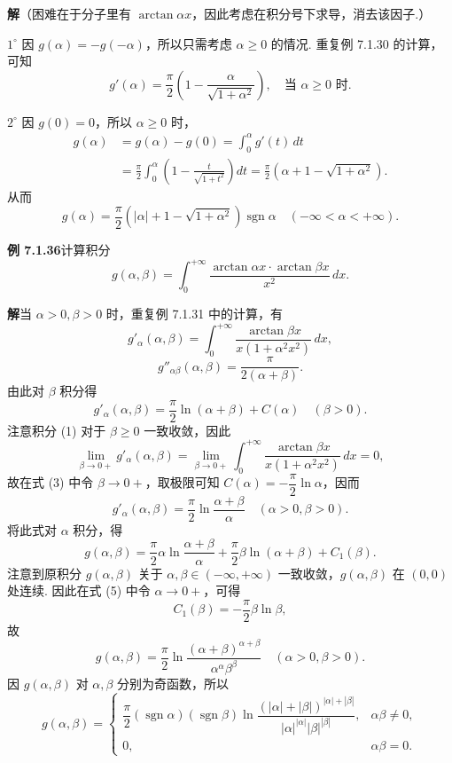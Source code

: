 \documentclass[UTF8,12pt,a4paper,fontset=fandol]{ctexart}
\begin{document}
\noindent\textbf{解}\quad （困难在于分子里有 $\arctan\alpha x$，因此考虑在积分号下求导，消去该因子.）

$1^\circ$ 因 $g(\alpha)=-g(-\alpha)$，所以只需考虑 $\alpha\ge0$ 的情况. 重复例 7.1.30 的计算，可知
\[
g'(\alpha)=\frac{\pi}{2}\left(1-\frac{\alpha}{\sqrt{1+\alpha^2}}\right),\quad \text{当 }\alpha\ge0\text{ 时}.
\]

$2^\circ$ 因 $g(0)=0$，所以 $\alpha\ge0$ 时，
\[
\begin{aligned}
g(\alpha)
&=g(\alpha)-g(0)=\int_0^\alpha g'(t)\,dt\\
&=\frac{\pi}{2}\int_0^\alpha\left(1-\frac{t}{\sqrt{1+t^2}}\right)dt
=\frac{\pi}{2}\left(\alpha+1-\sqrt{1+\alpha^2}\right).
\end{aligned}
\]
从而
\[
g(\alpha)=\frac{\pi}{2}\left(|\alpha|+1-\sqrt{1+\alpha^2}\right)\operatorname{sgn}\alpha
\quad(-\infty<\alpha<+\infty).
\]

\noindent\textbf{例 7.1.36}\quad 计算积分
\[
g(\alpha,\beta)=\int_0^{+\infty}\frac{\arctan\alpha x\cdot\arctan\beta x}{x^2}\,dx.
\]

\noindent\textbf{解}\quad 当 $\alpha>0,\beta>0$ 时，重复例 7.1.31 中的计算，有
\[
g'_\alpha(\alpha,\beta)
=\int_0^{+\infty}\frac{\arctan\beta x}{x(1+\alpha^2x^2)}\,dx,
\tag{1}
\]
\[
g''_{\alpha\beta}(\alpha,\beta)=\frac{\pi}{2(\alpha+\beta)}.
\tag{2}
\]
由此对 $\beta$ 积分得
\[
g'_\alpha(\alpha,\beta)=\frac{\pi}{2}\ln(\alpha+\beta)+C(\alpha)\quad(\beta>0).
\tag{3}
\]
注意积分 (1) 对于 $\beta\ge0$ 一致收敛，因此
\[
\lim_{\beta\to0+}g'_\alpha(\alpha,\beta)
=\lim_{\beta\to0+}\int_0^{+\infty}\frac{\arctan\beta x}{x(1+\alpha^2x^2)}\,dx=0,
\]
故在式 (3) 中令 $\beta\to0+$，取极限可知 $C(\alpha)=-\dfrac{\pi}{2}\ln\alpha$，因而
\[
g'_\alpha(\alpha,\beta)=\frac{\pi}{2}\ln\frac{\alpha+\beta}{\alpha}\quad(\alpha>0,\beta>0).
\tag{4}
\]
将此式对 $\alpha$ 积分，得
\[
g(\alpha,\beta)=\frac{\pi}{2}\alpha\ln\frac{\alpha+\beta}{\alpha}
+\frac{\pi}{2}\beta\ln(\alpha+\beta)+C_1(\beta).
\tag{5}
\]
注意到原积分 $g(\alpha,\beta)$ 关于 $\alpha,\beta\in(-\infty,+\infty)$ 一致收敛，$g(\alpha,\beta)$ 在 $(0,0)$ 处连续. 因此在式 (5) 中令 $\alpha\to0+$，可得
\[
C_1(\beta)=-\frac{\pi}{2}\beta\ln\beta,
\]
故
\[
g(\alpha,\beta)=\frac{\pi}{2}\ln\frac{(\alpha+\beta)^{\alpha+\beta}}{\alpha^\alpha\beta^\beta}
\quad(\alpha>0,\beta>0).
\tag{6}
\]
因 $g(\alpha,\beta)$ 对 $\alpha,\beta$ 分别为奇函数，所以
\[
g(\alpha,\beta)=
\begin{cases}
\dfrac{\pi}{2}(\operatorname{sgn}\alpha)(\operatorname{sgn}\beta)
\ln\dfrac{(|\alpha|+|\beta|)^{|\alpha|+|\beta|}}{|\alpha|^{|\alpha|}|\beta|^{|\beta|}}, & \alpha\beta\ne0,\\[0.8em]
0, & \alpha\beta=0.
\end{cases}
\]
\end{document}
